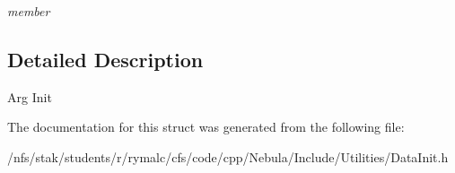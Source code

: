 \begin{DoxyCompactItemize}
\begin{DoxyCompactList}\small\item\em member \item\end{DoxyCompactList}\end{DoxyCompactItemize}


\subsection{Detailed Description}
Arg Init 

The documentation for this struct was generated from the following file:\begin{DoxyCompactItemize}
\item 
/nfs/stak/students/r/rymalc/cfs/code/cpp/Nebula/Include/Utilities/DataInit.h\end{DoxyCompactItemize}
